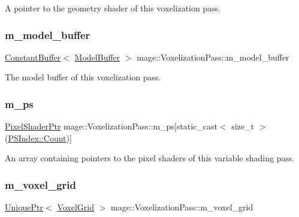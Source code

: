 A pointer to the geometry shader of this voxelization pass. \hypertarget{classmage_1_1_voxelization_pass_abc2abb38c64a8f6cf3a24934e9864860}{}\label{classmage_1_1_voxelization_pass_abc2abb38c64a8f6cf3a24934e9864860} 
\subsubsection{\texorpdfstring{m\+\_\+model\+\_\+buffer}{m\_model\_buffer}}
{\footnotesize\ttfamily \hyperlink{classmage_1_1_constant_buffer}{Constant\+Buffer}$<$ \hyperlink{structmage_1_1_model_buffer}{Model\+Buffer} $>$ mage\+::\+Voxelization\+Pass\+::m\+\_\+model\+\_\+buffer\hspace{0.3cm}{\ttfamily [private]}}

The model buffer of this voxelization pass. \hypertarget{classmage_1_1_voxelization_pass_aa0afe7d2b344249c513af0706ad8b22b}{}\label{classmage_1_1_voxelization_pass_aa0afe7d2b344249c513af0706ad8b22b} 
\subsubsection{\texorpdfstring{m\+\_\+ps}{m\_ps}}
{\footnotesize\ttfamily \hyperlink{namespacemage_acbec875bb5e5e085e32ed244a24d2b6f}{Pixel\+Shader\+Ptr} mage\+::\+Voxelization\+Pass\+::m\+\_\+ps\mbox{[}static\+\_\+cast$<$ size\+\_\+t $>$(\hyperlink{classmage_1_1_voxelization_pass_a3632bab7b0039dbbe10569618ae57589ae93f994f01c537c4e2f7d8528c3eb5e9}{P\+S\+Index\+::\+Count})\mbox{]}\hspace{0.3cm}{\ttfamily [private]}}

An array containing pointers to the pixel shaders of this variable shading pass. \hypertarget{classmage_1_1_voxelization_pass_a22b05bbc3e203b37c3cd30a3509e334f}{}\label{classmage_1_1_voxelization_pass_a22b05bbc3e203b37c3cd30a3509e334f} 
\subsubsection{\texorpdfstring{m\+\_\+voxel\+\_\+grid}{m\_voxel\_grid}}
{\footnotesize\ttfamily \hyperlink{namespacemage_a3316d7143a973e37adf1110f2e80ca31}{Unique\+Ptr}$<$ \hyperlink{classmage_1_1_voxel_grid}{Voxel\+Grid} $>$ mage\+::\+Voxelization\+Pass\+::m\+\_\+voxel\+\_\+grid\hspace{0.3cm}{\ttfamily [private]}}

